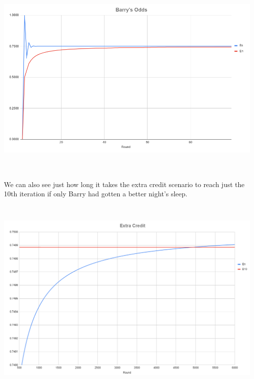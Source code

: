 \documentclass[10pt, letterpaper]{article}
\begin{document}
\includegraphics[height=10cm]{sorting_hat_01.png}

We can also see just how long it takes the extra credit scenario to reach just the 10th iteration if only Barry had gotten a better night's sleep.

\includegraphics[height=10cm]{sorting_hat_02.png}
\end{document}
